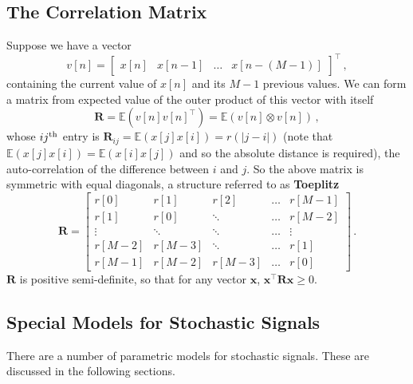\subsection{The Correlation Matrix}
%
Suppose we have a vector
%
\begin{displaymath}
  v[n] = \left[\begin{array}{cccc}
      x[n] & x[n-1] & \hdots & x[n-(M-1)]
    \end{array}\right]^\top \,,
\end{displaymath}
%
containing the current value of $x[n]$ and its $M-1$ previous values. We can
form a matrix from expected value of the outer product of this vector with itself
%
\begin{displaymath}
  \mathbf{R} = \mathbb{E}\left(v[n] v[n]^\top\right)
  = \mathbb{E}\left(v[n] \otimes v[n]\right) \,,
\end{displaymath}
%
whose $ij^\mathrm{th}\mkern1mu$ entry is $\mathbf{R}_{ij} = \mathbb{E}(x[j]x[i]) = r(|j-i|)$
(note that $\mathbb{E}(x[j]x[i]) = \mathbb{E}(x[i]x[j])$ and so the
absolute distance is required), the
auto-correlation of the difference between $i$ and $j$. So the above
matrix is symmetric with equal diagonals, a structure referred to as
\textbf{Toeplitz}
%
\begin{displaymath}
  \mathbf{R} = \left[\begin{array}{ccccc}
      r[0] & r[1] & r[2] & \hdots & r[M-1] \\
      r[1] & r[0] & \ddots & \hdots & r[M-2] \\
      \vdots & \ddots & \ddots & \hdots & \vdots \\
      r[M-2] & r[M-3] & \ddots & \hdots & r[1] \\
      r[M-1] & r[M-2] & r[M-3] & \hdots & r[0]
    \end{array}\right] \,.
\end{displaymath}
%
$\mathbf{R}$ is positive semi-definite, so that for any vector $\mathbf{x}$,
$\mathbf{x}^\top\mathbf{Rx}\geq 0$.

\subsection{Special Models for Stochastic Signals}
%
There are a number of parametric models for stochastic signals. These
are discussed in the following sections.

